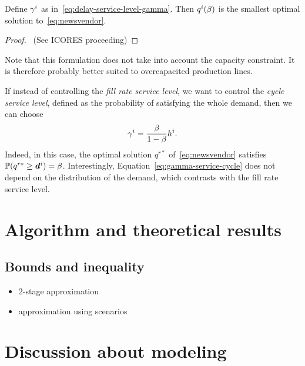 \begin{prop}\label{prop:vendor}
Define $\gamma^i$ as in~\eqref{eq:delay-service-level-gamma}. Then $q^i(\beta)$ is the smallest optimal solution to~\eqref{eq:newsvendor}.
\end{prop}

\begin{proof}
\tbc~(See ICORES proceeding)
\end{proof}

Note that this formulation does not take into account the capacity constraint. It is therefore probably better suited to overcapacited production lines.

\begin{rmq}
If instead of controlling the {\em fill rate service level}, we want to control the {\em cycle service level}, defined as the probability of satisfying the whole demand, then we can choose
\begin{equation}
\label{eq:gamma-service-cycle}
\gamma^i = \frac{\beta}{1-\beta} h^i.
\end{equation}
Indeed, in this case, the optimal solution $q^{r*}$ of~\eqref{eq:newsvendor} satisfies $\PP(q^{r*} \geq \va d^i) = \servicelvl$. Interestingly, Equation~\eqref{eq:gamma-service-cycle} does not depend on the distribution of the demand, which contrasts with the fill rate service level.
\end{rmq}







\section{Algorithm and theoretical results}

\subsection{Bounds and inequality}

\begin{itemize}
  \item 2-stage approximation
  \item approximation using scenarios
\end{itemize}


\section{Discussion about modeling}
\label{sec:stoch-CLSP-BS-discussion}

